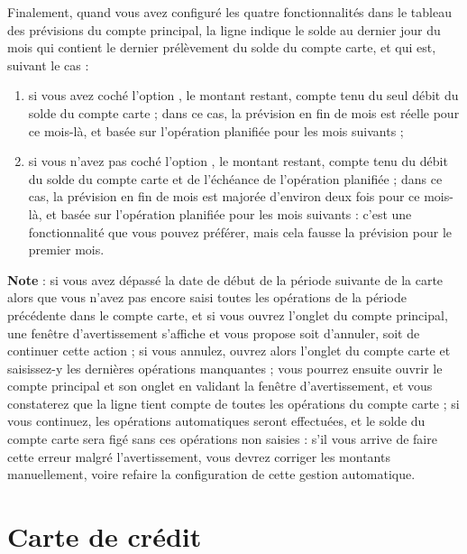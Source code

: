 Finalement, quand vous avez configuré les quatre fonctionnalités dans le tableau des prévisions du compte principal, la ligne  indique le solde au dernier jour du mois qui contient le dernier prélèvement du solde du compte carte, et qui est, suivant le cas :
\begin{enumerate}
	\item si vous avez coché l'option , le montant restant, compte tenu du seul débit du solde du compte carte ; dans ce cas, la prévision en fin de mois est réelle pour ce mois-là, et basée sur l'opération planifiée pour les mois suivants ; 
	\item si vous n'avez pas coché l'option , le montant restant, compte tenu du débit du solde du compte carte et de l'échéance de l'opération planifiée ; dans ce cas, la prévision en fin de mois est majorée d'environ deux fois pour ce mois-là, et basée sur l'opération planifiée pour les mois suivants : c'est une fonctionnalité que vous pouvez préférer, mais cela fausse la prévision pour le premier mois.
\end{enumerate}

 \textbf{Note} : si vous avez dépassé la date de début de la période suivante de la carte alors que vous n'avez pas encore saisi toutes les opérations de la période précédente dans le compte carte, et si vous ouvrez l'onglet  du compte principal, une fenêtre d'avertissement s'affiche et vous propose soit d'annuler, soit de continuer cette action ; si vous annulez, ouvrez alors l'onglet  du compte carte et saisissez-y les dernières opérations manquantes ; vous pourrez ensuite ouvrir le compte principal et son onglet  en validant la fenêtre d'avertissement, et vous constaterez que la ligne  tient compte de toutes les opérations du compte carte ; si vous continuez, les opérations automatiques seront effectuées, et le solde du compte carte sera figé sans ces opérations non saisies : s'il vous arrive de faire cette erreur malgré l'avertissement, vous devrez corriger les montants manuellement, voire refaire la configuration de cette gestion automatique.
 
 
\section{Carte de crédit\label{bankcard-creditCard}}

